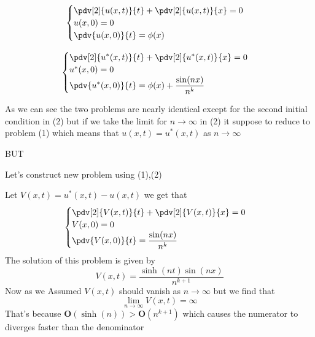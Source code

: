 \begin{minipage}{.5\textwidth}
        \begin{equation}
                \begin{cases}
                        \displaystyle \pdv[2]{u(x,t)}{t} + \pdv[2]{u(x,t)}{x} = 0
                        \\
                        u(x,0) = 0
                        \\
                        \displaystyle \pdv{u(x,0)}{t} = \phi(x)
                \end{cases}        
        \end{equation}
\end{minipage}
\begin{minipage}{.5\textwidth}
        \begin{equation}
                \begin{cases}
                        \displaystyle \pdv[2]{u^{*}(x,t)}{t} + \pdv[2]{u^{*}(x,t)}{x} = 0
                        \\
                        u^{*}(x,0) = 0
                        \\
                        \displaystyle \pdv{u^{*}(x,0)}{t} = \phi(x) + \frac{\sin(nx)}{n^{k}}
                \end{cases}               
        \end{equation}
\end{minipage}


As we can see the two problems are nearly identical except for the second initial condition in (2) but if we take the 
limit for $n \to \infty$ in (2) it suppose to reduce to problem (1) which means that $u(x,t) = u^{*}(x,t)$ as $n \to \infty$

BUT

Let's construct new problem using (1),(2)

Let $V(x,t) = u^{*}(x,t) - u(x,t)$ we get that 
\begin{equation}
        \begin{cases}
                \displaystyle \pdv[2]{V(x,t)}{t} + \pdv[2]{V(x,t)}{x} = 0
                \\
                V(x,0) = 0
                \\
                \displaystyle \pdv{V(x,0)}{t} =\frac{\sin(nx)}{n^{k}}
        \end{cases}               
\end{equation}
The solution of this problem is given by 
\[
V(x,t) = \frac{\sinh(nt)\sin(nx)}{n^{k+1}}
\]
Now as we Assumed $V(x,t)$ should vanish as $n \to \infty$ but we find that 
\[
\lim_{n \to \infty} V(x,t) = \infty
\]
That's because $\mathbf{O}(\sinh(n)) > \mathbf{O}(n^{k+1})$ which causes the numerator to diverges faster than the denominator
\setcounter{equation}{0}
